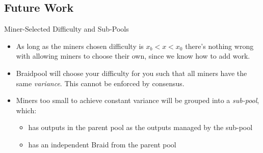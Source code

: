 \documentclass[tikz,mathserif,usenames,dvipsnames,svgnames,table]{beamer}
\newlength{\wideitemsep}
\let\olditem\item
\renewcommand{\item}{\setlength{\itemsep}{\wideitemsep}\olditem}
\begin{document}
\subsection{Future Work}
\begin{frame}{Miner-Selected Difficulty and Sub-Pools}
    \begin{itemize}
        \item As long as the miners chosen difficulty is $x_b < x < x_0$ there's
            nothing wrong with allowing miners to choose their own, since we
            know how to add work.
        \item Braidpool will choose your difficulty for you such that all miners have the same {\it
            variance}. This cannot be enforced by consensus.
        \item Miners too small to achieve constant variance will be grouped into
            a {\it sub-pool}, which:
            \begin{itemize}
                \item has outputs in the parent pool as the outputs managed by the sub-pool
                \item has an independent Braid from the parent pool
            \end{itemize}
    \end{itemize}
\end{frame}
\end{document}
